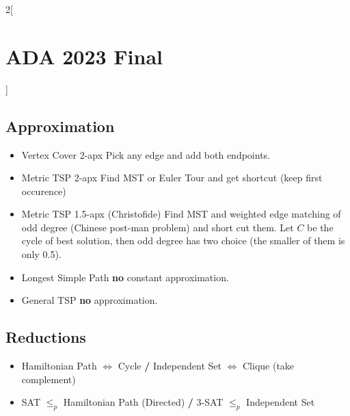 \documentclass[10pt,a4paper]{report}
\begin{document}
\begin{multicols}{2}[\section*{ADA 2023 Final}]
\subsection*{Approximation}
  \begin{itemize}
    \item Vertex Cover 2-apx \quad\quad Pick any edge and add both endpoints.    \vspace{-0.65em}
    \item Metric TSP 2-apx   \quad\quad Find MST or Euler Tour and get shortcut (keep first occurence) \vspace{-0.65em}
    \item Metric TSP 1.5-apx \quad\quad (Christofide) Find MST and weighted edge matching of odd degree (Chinese post-man problem) and short cut them. Let $C$ be the cycle of best solution, then odd degree has two choice (the smaller of them is only 0.5).  \vspace{-0.65em}
    \item Longest Simple Path \textbf{no} constant approximation. \vspace{-0.65em}
    \item General TSP         \textbf{no} approximation.
  \end{itemize}


\subsection*{Reductions}
  \begin{itemize}
    \item Hamiltonian Path $\Longleftrightarrow$ Cycle \textbf{/} Independent Set $\Longleftrightarrow$ Clique (take complement)
    \item SAT $\leq_p$ Hamiltonian Path (Directed) \textbf{/} 3-SAT $\leq_p$ Independent Set 


\end{itemize}
\end{multicols}
\end{document}
